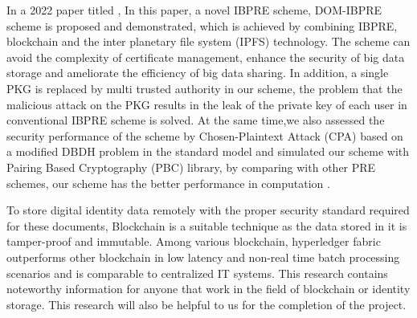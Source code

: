  In a 2022 paper titled , In this paper, a novel IBPRE scheme, DOM-IBPRE scheme is proposed and demonstrated, which is achieved by combining IBPRE, blockchain and the inter planetary file system (IPFS) technology. The scheme can avoid the complexity of certificate management, enhance the security of big data storage and ameliorate the efficiency of big data sharing. In addition, a single PKG is replaced by multi trusted authority in our scheme, the problem that the malicious attack on the PKG results in the leak of the private key of each user in conventional IBPRE scheme is solved\cite{he2021efficient}. At the same time,we also assessed the security performance of the scheme by Chosen-Plaintext Attack (CPA) based on a modified DBDH problem in the standard model and simulated our scheme with Pairing Based Cryptography (PBC) library, by comparing with other PRE schemes, our scheme has the better performance in computation .

 To store digital identity data remotely with the proper security standard required for these documents, Blockchain is a suitable technique as the data stored in it is tamper-proof and immutable. Among various blockchain, hyperledger fabric outperforms other blockchain in low latency and non-real time batch processing scenarios and is comparable to centralized IT systems. This research contains noteworthy information for anyone that work in the field of blockchain or identity storage. This research will also be helpful to us for the completion of the project.   